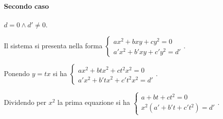 \paragraph{Secondo caso}$d=0 \wedge d'\neq 0$.

Il sistema si presenta nella forma $\left\{\begin{array}{l}{{ax}^2+{bxy}+{cy}^2=0}\\{a'x^2+b'{xy}+c'y^2=d'}\end{array}\right.$.

Ponendo $y={tx}$ si ha $\left\{\begin{array}{l}{{ax}^2+{btx}^2+{ct}^2x^2=0}\\{a'x^2+b'{tx}^2+c't^2x^2=d'}\end{array}\right.$.

Dividendo per $x^2$ la prima equazione si ha $\left\{\begin{array}{l}{a+{bt}+{ct}^2=0}\\{x^2(a'+b't+c't^2)=d'}\end{array}\right.$.

